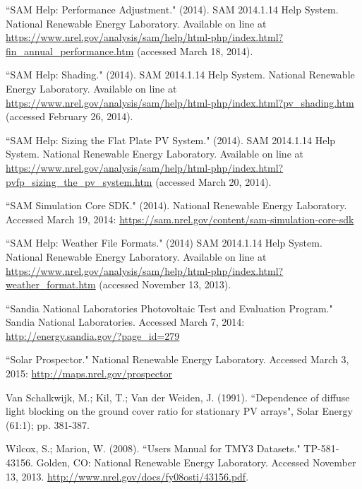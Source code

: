 \documentclass[12pt,letterpaper]{article}
\begin{document}
\begin{thebibliography}{99}
 ``SAM Help: Performance Adjustment." (2014). SAM 2014.1.14 Help System. National Renewable Energy Laboratory. Available on line at \url{https://www.nrel.gov/analysis/sam/help/html-php/index.html?fin_annual_performance.htm} (accessed March 18, 2014).

 ``SAM Help: Shading." (2014). SAM 2014.1.14 Help System. National Renewable Energy Laboratory. Available on line at \url{https://www.nrel.gov/analysis/sam/help/html-php/index.html?pv_shading.htm} (accessed February 26, 2014).

 ``SAM Help: Sizing the Flat Plate PV System." (2014). SAM 2014.1.14 Help System. National Renewable Energy Laboratory. Available on line at \url{https://www.nrel.gov/analysis/sam/help/html-php/index.html?pvfp\_sizing\_the\_pv\_system.htm} (accessed March 20, 2014).

 ``SAM Simulation Core SDK." (2014). National Renewable Energy Laboratory. Accessed March 19, 2014: \url{https://sam.nrel.gov/content/sam-simulation-core-sdk}

 ``SAM Help: Weather File Formats." (2014) SAM 2014.1.14 Help System. National Renewable Energy Laboratory. Available on line at  \url{https://www.nrel.gov/analysis/sam/help/html-php/index.html?weather_format.htm} (accessed November 13, 2013).

 ``Sandia National Laboratories Photovoltaic Test and Evaluation Program." Sandia National Laboratories. Accessed March 7, 2014: \url{http://energy.sandia.gov/?page_id=279}

``Solar Prospector." National Renewable Energy Laboratory. Accessed March 3, 2015: \url{http://maps.nrel.gov/prospector}

 Van Schalkwijk, M.; Kil, T.; Van der Weiden, J. (1991). ``Dependence of diffuse light blocking on the ground cover ratio for stationary PV arrays", Solar Energy (61:1); pp. 381-387.

 Wilcox, S.; Marion, W. (2008). ``Users Manual for TMY3 Datasets." TP-581-43156. Golden, CO: National Renewable Energy Laboratory. Accessed November 13, 2013. \url{http://www.nrel.gov/docs/fy08osti/43156.pdf}.


\end{thebibliography}
\end{document}
